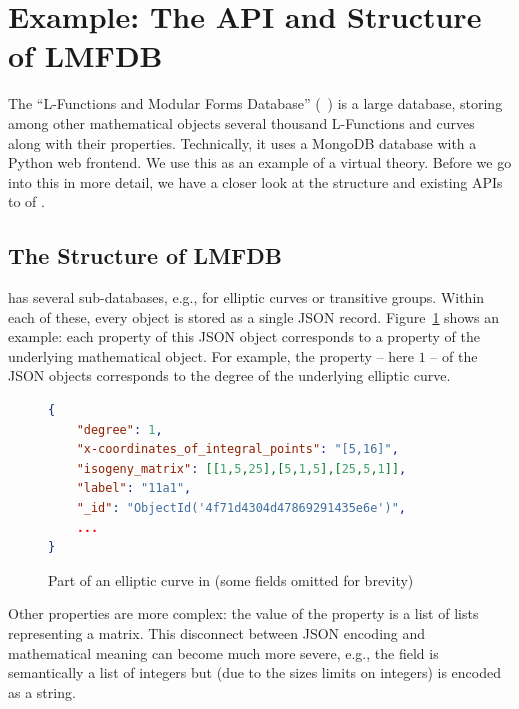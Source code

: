 \section{Example: The API and Structure of LMFDB}\label{sec:sota}

The ``L-Functions and Modular Forms Database'' (\lmfdb~\cite{lmfdb}) is a large database, storing among other mathematical objects several thousand L-Functions and curves along with their properties. 
Technically, it uses a MongoDB database with a Python web frontend. 
We use this as an example of a virtual theory. 
Before we go into this in more detail, we have a closer look at the structure and existing APIs to of \lmfdb.

\subsection{The Structure of LMFDB}\label{sec:sota:struct}

\lmfdb has several sub-databases, e.g., for elliptic curves or transitive groups. 
Within each of these, every object is stored as a single JSON record.
Figure~\ref{fig:lmfdbexample} shows an example: each property of this JSON object corresponds to a property of the underlying mathematical object. 
For example, the  property -- here $1$ -- of the JSON objects corresponds to the degree of the underlying elliptic curve. 

\begin{figure}[ht]\centering
\begin{lstlisting}[language=json]
{
    "degree": 1,
    "x-coordinates_of_integral_points": "[5,16]",
    "isogeny_matrix": [[1,5,25],[5,1,5],[25,5,1]],
    "label": "11a1",
    "_id": "ObjectId('4f71d4304d47869291435e6e')",
    ...
}
\end{lstlisting}\vspace*{-1.5em}
  \caption[An elliptic curve from \lmfdb]{
    Part of an elliptic curve in \lmfdb (some fields omitted for brevity)
  }
  \label{fig:lmfdbexample}
\end{figure}

Other properties are more complex: the value of the  property is a list of lists representing a matrix. 
This disconnect between JSON encoding and mathematical meaning can become much more severe, e.g., the  field is semantically a list of integers but (due to the sizes limits on integers) is encoded as a string.

